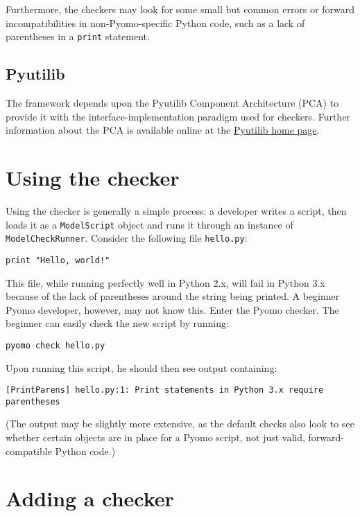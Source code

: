 \documentclass{article}
\begin{document}
Furthermore, the checkers may look for some small but common errors or forward incompatibilities in non-Pyomo-specific Python code, such as a lack of parentheses in a \verb!print! statement.

\subsection*{Pyutilib}
The framework depends upon the Pyutilib Component Architecture (PCA) to provide it with the interface-implementation paradigm used for checkers. Further information about the PCA is available online at the \href{https://software.sandia.gov/trac/pyutilib}{Pyutilib home page}.

\section*{Using the checker}
Using the checker is generally a simple process: a developer writes a script, then loads it as a \verb!ModelScript! object and runs it through an instance of \verb!ModelCheckRunner!. Consider the following file \verb!hello.py!:

\begin{verbatim}
print "Hello, world!"
\end{verbatim}

This file, while running perfectly well in Python 2.x, will fail in Python 3.x because of the lack of parentheses around the string being printed. A beginner Pyomo developer, however, may not know this. Enter the Pyomo checker. The beginner can easily check the new script by running:

\begin{verbatim}
pyomo check hello.py
\end{verbatim}

Upon running this script, he should then see output containing:

\begin{verbatim}
[PrintParens] hello.py:1: Print statements in Python 3.x require parentheses
\end{verbatim}

\noindent (The output may be slightly more extensive, as the default checks also look to see whether certain objects are in place for a Pyomo script, not just valid, forward-compatible Python code.)

\section*{Adding a checker}
\end{document}
